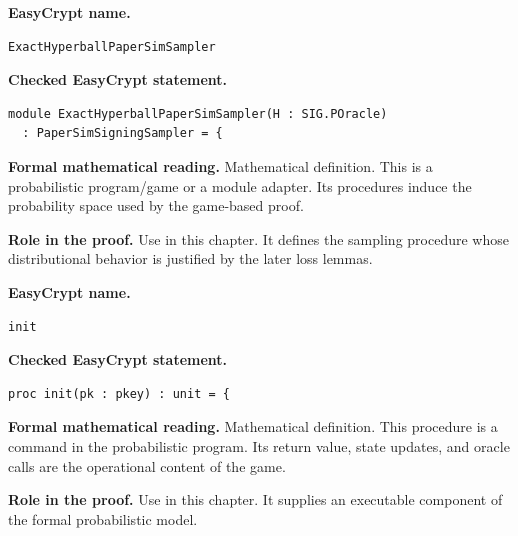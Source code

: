 \begin{formaldefinition}
\noindent\textbf{EasyCrypt name.}
\begin{lstlisting}[language=EasyCrypt,basicstyle=\ttfamily\scriptsize]
ExactHyperballPaperSimSampler
\end{lstlisting}
\noindent\textbf{Checked EasyCrypt statement.}
\begin{lstlisting}[language=EasyCrypt,basicstyle=\ttfamily\scriptsize]
module ExactHyperballPaperSimSampler(H : SIG.POracle)
  : PaperSimSigningSampler = {
\end{lstlisting}
\noindent\textbf{Formal mathematical reading.}
Mathematical definition. This is a probabilistic program/game or a module adapter.  Its procedures induce the probability space used by the game-based proof.

\noindent\textbf{Role in the proof.}
Use in this chapter. It defines the sampling procedure whose distributional behavior is justified by the later loss lemmas.

\end{formaldefinition}

\begin{formaldefinition}
\noindent\textbf{EasyCrypt name.}
\begin{lstlisting}[language=EasyCrypt,basicstyle=\ttfamily\scriptsize]
init
\end{lstlisting}
\noindent\textbf{Checked EasyCrypt statement.}
\begin{lstlisting}[language=EasyCrypt,basicstyle=\ttfamily\scriptsize]
proc init(pk : pkey) : unit = {
\end{lstlisting}
\noindent\textbf{Formal mathematical reading.}
Mathematical definition. This procedure is a command in the probabilistic program.  Its return value, state updates, and oracle calls are the operational content of the game.

\noindent\textbf{Role in the proof.}
Use in this chapter. It supplies an executable component of the formal probabilistic model.

\end{formaldefinition}

